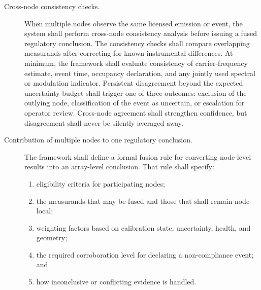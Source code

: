 \documentclass[11pt]{report}
\begin{document}
\begin{description}
	\item[Cross-node consistency checks.] When multiple nodes observe the same licensed emission or event, the system shall perform cross-node consistency analysis before issuing a fused regulatory conclusion. The consistency checks shall compare overlapping measurands after correcting for known instrumental differences. At minimum, the framework shall evaluate consistency of carrier-frequency estimate, event time, occupancy declaration, and any jointly used spectral or modulation indicator. Persistent disagreement beyond the expected uncertainty budget shall trigger one of three outcomes: exclusion of the outlying node, classification of the event as uncertain, or escalation for operator review. Cross-node agreement shall strengthen confidence, but disagreement shall never be silently averaged away.
	\item[Contribution of multiple nodes to one regulatory conclusion.] The framework shall define a formal fusion rule for converting node-level results into an array-level conclusion. That rule shall specify:
	\begin{enumerate}
		\item eligibility criteria for participating nodes;
		\item the measurands that may be fused and those that shall remain node-local;
		\item weighting factors based on calibration state, uncertainty, health, and geometry;
		\item the required corroboration level for declaring a non-compliance event; and
		\item how inconclusive or conflicting evidence is handled.
	\end{enumerate}
	

\end{description}
\end{document}
